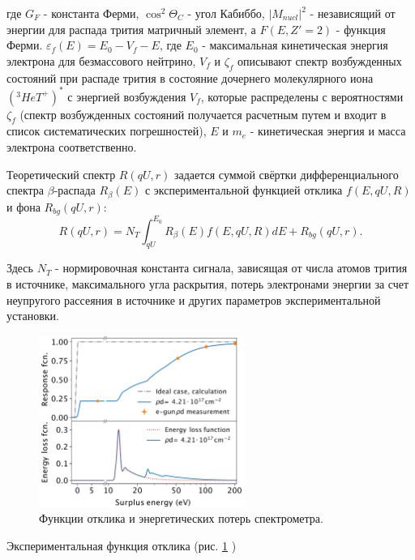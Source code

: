 \documentclass[a4paper,14pt]{extarticle}
\begin{document}
    \noindent где $G_F$ - константа Ферми, $\cos^2 \Theta_C$ - угол Кабиббо, $|M_{nucl}|^2$ - независящий от энергии для распада трития матричный
    элемент, а $F(E, Z'=2)$ - функция Ферми. $\varepsilon_f(E) = E_0 - V_f - E$, где $E_0$ - максимальная кинетическая
    энергия электрона для безмассового нейтрино, $V_f$ и $\zeta_f$ описывают спектр возбужденных состояний при распаде
    трития в состояние дочернего молекулярного иона $(^3HeT^+)^*$ с энергией возбуждения $V_f$, которые распределены с
    вероятностями $\zeta_f$ (спектр возбужденных состояний получается расчетным путем и входит в список 
    систематических погрешностей), $E$ и $m_e$ - кинетическая энергия и масса электрона соответственно.
    
    Теоретический спектр $R(qU,r)$ задается суммой свёртки дифференциального спектра $\beta$-распада $R_{\beta}(E)$ 
    с экспериментальной функцией отклика $f(E,qU,R)$ и фона $R_{bg}(qU,r)$:
    \begin{equation}
      R(qU,r)=N_T \int_{qU}^{E_0} R_{\beta}(E)f(E,qU,R)dE + R_{bg}(qU,r).
    \end{equation}
    
    Здесь $N_T$ - нормировочная константа сигнала, зависящая от числа атомов трития в источнике, максимального угла
    раскрытия, потерь электронами энергии за счет неупругого рассеяния в источнике и других параметров
    экспериментальной установки. 
    
    \begin{figure}
        \center
        \includegraphics[width=0.6\textwidth]{response.png}
        \captionsetup{width=0.8\textwidth}
        \caption{Функции отклика и энергетических потерь спектрометра.}
        \label{fig:response}
    \end{figure}
    
    Экспериментальная функция отклика (рис. \ref{fig:response} \cite{katrin_status})
    
\end{document}
